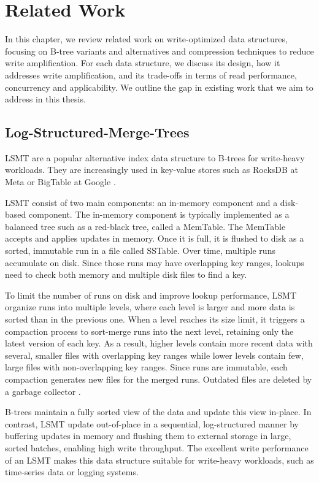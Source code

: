 \chapter{Related Work}
\label{chap:related-work}
In this chapter, we review related work on write-optimized data structures, focusing on B-tree variants and alternatives and compression techniques to reduce write amplification.
For each data structure, we discuss its design, how it addresses write amplification, and its trade-offs in terms of read performance, concurrency and applicability.
We outline the gap in existing work that we aim to address in this thesis.

\section{Log-Structured-Merge-Trees}
\ac{LSMT} \cite{oneil1996log} are a popular alternative index data structure to B-trees for write-heavy workloads.
They are increasingly used in key-value stores such as RocksDB at Meta \cite{rocksdb} or BigTable at Google \cite{chang2008bigtable}.

\ac{LSMT} consist of two main components: an in-memory component and a disk-based component.
The in-memory component is typically implemented as a balanced tree such as a red-black tree, called a MemTable.
The MemTable accepts and applies updates in memory.
Once it is full, it is flushed to disk as a sorted, immutable run in a file called SSTable.
Over time, multiple runs accumulate on disk.
Since those runs may have overlapping key ranges, lookups need to check both memory and multiple disk files to find a key.

To limit the number of runs on disk and improve lookup performance, \ac{LSMT} organize runs into multiple levels, where each level is larger and more data is sorted than in the previous one.
When a level reaches its size limit, it triggers a compaction process to sort-merge runs into the next level, retaining only the latest version of each key.
As a result, higher levels contain more recent data with several, smaller files with overlapping key ranges while lower levels contain few, large files with non-overlapping key ranges.
Since runs are immutable, each compaction generates new files for the merged runs.
Outdated files are deleted by a garbage collector \cite{sarkar2022lsmt}.


B-trees maintain a fully sorted view of the data and update this view in-place.
In contrast, \ac{LSMT} update out-of-place in a sequential, log-structured manner by buffering updates in memory and flushing them to external storage in large, sorted batches, enabling high write throughput.
The excellent write performance of an \ac{LSMT} makes this data structure suitable for write-heavy workloads, such as time-series data or logging systems.

